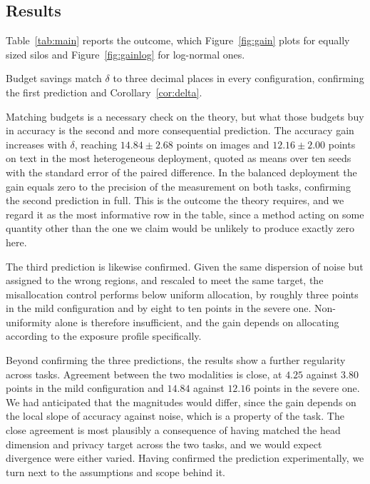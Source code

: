 \documentclass[acmsmall,screen,review,anonymous]{acmart}
\theoremstyle{acmdefinition}%
\begin{document}
\subsection{Results}

Table~\ref{tab:main} reports the outcome, which Figure~\ref{fig:gain} plots for
equally sized silos and Figure~\ref{fig:gainlog} for log-normal ones.

Budget savings match $\delta$ to three decimal places in every configuration,
confirming the first prediction and Corollary~\ref{cor:delta}.

Matching budgets is a necessary check on the theory, but what those budgets buy in
accuracy is the second and more consequential prediction. The accuracy gain
increases with $\delta$, reaching $14.84 \pm 2.68$ points on images and $12.16 \pm
2.00$ points on text in the most heterogeneous deployment, quoted as means over
ten seeds with the standard error of the paired difference. In the balanced
deployment the gain equals zero to the precision of the measurement on both
tasks, confirming the second prediction in full. This is the outcome the theory
requires, and we regard it as the most informative row in the table, since a
method acting on some quantity other than the one we claim would be unlikely to
produce exactly zero here.

The third prediction is likewise confirmed. Given the same dispersion of noise but
assigned to the wrong regions, and rescaled to meet the same target, the
misallocation control performs below uniform allocation, by roughly three points
in the mild configuration and by eight to ten points in the severe one.
Non-uniformity alone is therefore insufficient, and the gain depends on allocating
according to the exposure profile specifically.

Beyond confirming the three predictions, the results show a further regularity
across tasks. Agreement between the two modalities is close, at $4.25$ against
$3.80$ points in the mild configuration and $14.84$ against $12.16$ points in the
severe one. We had anticipated that the magnitudes would differ, since the gain
depends on the local slope of accuracy against noise, which is a property of the
task. The close agreement is most plausibly a consequence of having matched the
head dimension and privacy target across the two tasks, and we would expect
divergence were either varied. Having confirmed the prediction experimentally, we
turn next to the assumptions and scope behind it.
\end{document}
